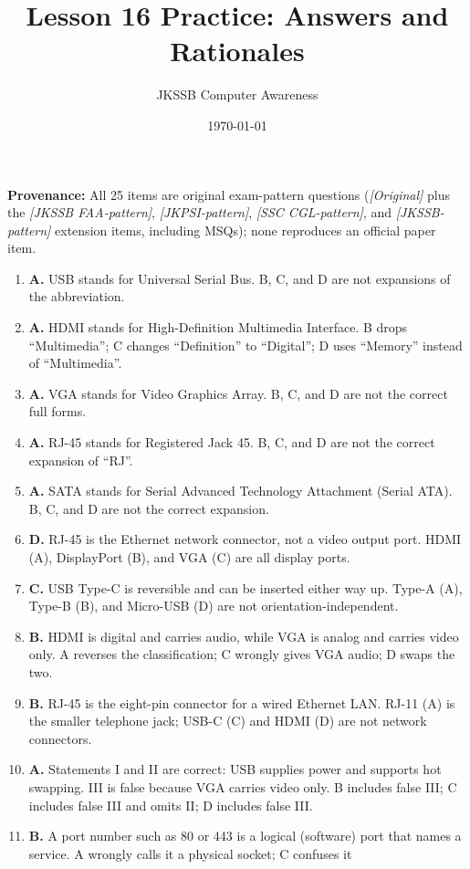\documentclass[11pt]{article}
\title{Lesson 16 Practice: Answers and Rationales}
\author{JKSSB Computer Awareness}
\date{\today}
\begin{document}
\maketitle
\noindent\textbf{Provenance:} All 25 items are original exam-pattern questions (\textit{[Original]} plus the \textit{[JKSSB FAA-pattern]}, \textit{[JKPSI-pattern]}, \textit{[SSC CGL-pattern]}, and \textit{[JKSSB-pattern]} extension items, including MSQs); none reproduces an official paper item.
\begin{enumerate}[label=\textbf{Q\arabic*.}, leftmargin=*]
\item \textbf{A.} USB stands for Universal Serial Bus. B, C, and D are not
  expansions of the abbreviation.
\item \textbf{A.} HDMI stands for High-Definition Multimedia Interface. B
  drops ``Multimedia''; C changes ``Definition'' to ``Digital''; D uses
  ``Memory'' instead of ``Multimedia''.
\item \textbf{A.} VGA stands for Video Graphics Array. B, C, and D are not the
  correct full forms.
\item \textbf{A.} RJ-45 stands for Registered Jack 45. B, C, and D are not the
  correct expansion of ``RJ''.
\item \textbf{A.} SATA stands for Serial Advanced Technology Attachment (Serial
  ATA). B, C, and D are not the correct expansion.
\item \textbf{D.} RJ-45 is the Ethernet network connector, not a video output
  port. HDMI (A), DisplayPort (B), and VGA (C) are all display ports.
\item \textbf{C.} USB Type-C is reversible and can be inserted either way up.
  Type-A (A), Type-B (B), and Micro-USB (D) are not orientation-independent.
\item \textbf{B.} HDMI is digital and carries audio, while VGA is analog and
  carries video only. A reverses the classification; C wrongly gives VGA
  audio; D swaps the two.
\item \textbf{B.} RJ-45 is the eight-pin connector for a wired Ethernet LAN.
  RJ-11 (A) is the smaller telephone jack; USB-C (C) and HDMI (D) are not
  network connectors.
\item \textbf{A.} Statements I and II are correct: USB supplies power and
  supports hot swapping. III is false because VGA carries video only. B
  includes false III; C includes false III and omits II; D includes false III.
\item \textbf{B.} A port number such as 80 or 443 is a logical (software) port
  that names a service. A wrongly calls it a physical socket; C confuses it

\end{enumerate}
\end{document}
